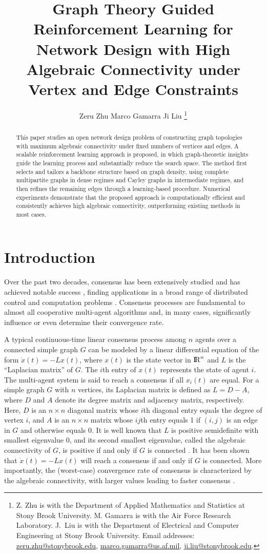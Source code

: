 \documentclass[letterpaper, 10 pt, conference]{ieeeconf}  %
\title{\LARGE \bf Graph Theory Guided Reinforcement Learning for Network Design with High Algebraic Connectivity under Vertex and Edge Constraints
}
\author{Zeru Zhu \hspace{.3in} Marco Gamarra \hspace{.3in} Ji Liu
\thanks{Z. Zhu is with the Department of Applied Mathematics and Statistics at Stony Brook University.
M. Gamarra is with the Air Force Research Laboratory.
J.~Liu is with the Department of Electrical and Computer Engineering at Stony Brook University.
Email addresses: 
\href{mailto:zeru.zhu@stonybrook.edu}{zeru.zhu@stonybrook.edu},
\href{mailto:marco.gamarra@us.af.mil}{marco.gamarra@us.af.mil},
\href{mailto:ji.liu@stonybrook.edu}{ji.liu@stonybrook.edu}.
}
}
\newcommand{\R}{{\rm I\!R}}
\newcommand{\bbb}{\mathbb}
\newcommand{\1}{\mathbf{1}}
\newcommand{\0}{\mathbf{0}}
\begin{document}
\maketitle
\thispagestyle{empty}
\pagestyle{empty}


\begin{abstract}
This paper studies an open network design problem of constructing graph topologies with maximum algebraic connectivity under fixed numbers of vertices and edges. A scalable reinforcement learning approach is proposed, in which graph-theoretic insights guide the learning process and substantially reduce the search space. The method first selects and tailors a backbone structure based on graph density, using complete multipartite graphs in dense regimes and Cayley graphs in intermediate regimes, and then refines the remaining edges through a learning-based procedure. Numerical experiments demonstrate that the proposed approach is computationally efficient and consistently achieves high algebraic connectivity, outperforming existing methods in most cases.
\end{abstract}



\section{Introduction}


Over the past two decades, consensus has been extensively studied and has achieved notable success \cite{vicsekmodel,reza1,luc,ReBe05}, finding applications in a broad range of distributed control and computation problems \cite{fax,survey,nedic2009distributed,tacle,split}.
Consensus processes are fundamental to almost all cooperative multi-agent algorithms and, in many cases, significantly influence or even determine their convergence rate.


A typical continuous-time linear consensus process among $n$ agents over a connected simple graph $G$ can be modeled by a linear differential equation of the form $\dot x(t)=-Lx(t)$, where $x(t)$ is the state vector in $\R^n$ and $L$ is the ``Laplacian matrix'' of $G$. 
The $i$th entry of $x(t)$ represents the state of agent $i$. 
The multi-agent system is said to reach a consensus if all $x_i(t)$ are equal. 
For a simple graph $G$ with $n$ vertices, its Laplacian matrix is defined as $L=D-A$, where $D$ and $A$ denote its degree matrix and adjacency matrix, respectively. 
Here, $D$ is an $n\times n$ diagonal matrix whose $i$th diagonal entry equals the degree of vertex $i$, and $A$ is an $n\times n$ matrix whose $ij$th entry equals 1 if $(i,j)$ is an edge in $G$ and otherwise equals 0. 
It is well known that $L$ is positive semidefinite with smallest eigenvalue $0$, and its second smallest eigenvalue, called the algebraic connectivity of $G$, 
is positive if and only if $G$ is connected \cite{Fiedler73}. 
It has been shown that $\dot x(t)=-Lx(t)$ will reach a consensus if and only if $G$ is connected. 
More importantly, the (worst-case) convergence rate of consensus is characterized by the algebraic connectivity, with larger values leading to faster consensus \cite{reza1}. 
\end{document}

